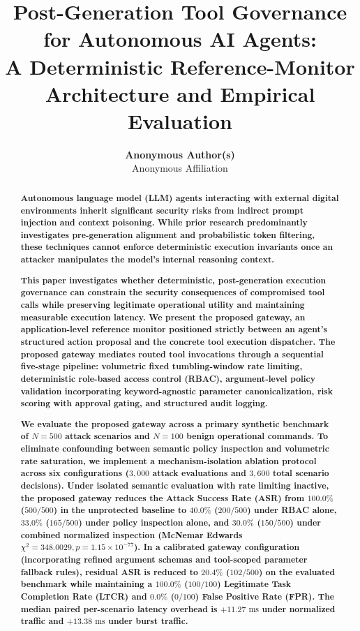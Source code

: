 \documentclass[10pt,twocolumn,letterpaper]{article}
\title{\textbf{\Large Post-Generation Tool Governance for Autonomous AI Agents:\\A Deterministic Reference-Monitor Architecture and Empirical Evaluation}}
\author{\textbf{Anonymous Author(s)}\\ \small Anonymous Affiliation}
\date{}
\begin{document}
\maketitle

\begin{abstract}
\textbf{Autonomous language model (LLM) agents interacting with external digital environments inherit significant security risks from indirect prompt injection and context poisoning. While prior research predominantly investigates pre-generation alignment and probabilistic token filtering, these techniques cannot enforce deterministic execution invariants once an attacker manipulates the model's internal reasoning context.}

\textbf{This paper investigates whether deterministic, post-generation execution governance can constrain the security consequences of compromised tool calls while preserving legitimate operational utility and maintaining measurable execution latency. We present the proposed gateway, an application-level reference monitor positioned strictly between an agent's structured action proposal and the concrete tool execution dispatcher. The proposed gateway mediates routed tool invocations through a sequential five-stage pipeline: volumetric fixed tumbling-window rate limiting, deterministic role-based access control (RBAC), argument-level policy validation incorporating keyword-agnostic parameter canonicalization, risk scoring with approval gating, and structured audit logging.}

\textbf{We evaluate the proposed gateway across a primary synthetic benchmark of $N=500$ attack scenarios and $N=100$ benign operational commands. To eliminate confounding between semantic policy inspection and volumetric rate saturation, we implement a mechanism-isolation ablation protocol across six configurations ($3{,}000$ attack evaluations and $3{,}600$ total scenario decisions). Under isolated semantic evaluation with rate limiting inactive, the proposed gateway reduces the Attack Success Rate (ASR) from $100.0\%$ ($500/500$) in the unprotected baseline to $40.0\%$ ($200/500$) under RBAC alone, $33.0\%$ ($165/500$) under policy inspection alone, and $30.0\%$ ($150/500$) under combined normalized inspection (McNemar Edwards $\chi^2 = 348.0029, p = 1.15 \times 10^{-77}$). In a calibrated gateway configuration (incorporating refined argument schemas and tool-scoped parameter fallback rules), residual ASR is reduced to $20.4\%$ ($102/500$) on the evaluated benchmark while maintaining a $100.0\%$ ($100/100$) Legitimate Task Completion Rate (LTCR) and $0.0\%$ ($0/100$) False Positive Rate (FPR). The median paired per-scenario latency overhead is $+11.27\text{ ms}$ under normalized traffic and $+13.38\text{ ms}$ under burst traffic.}


\end{abstract}
\end{document}
